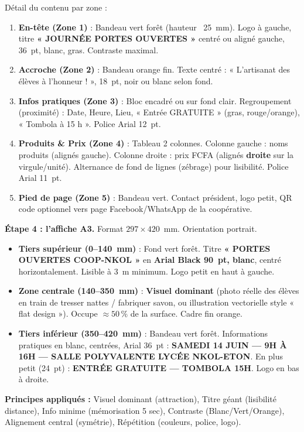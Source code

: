 \documentclass[11pt]{article}
\begin{document}
\begin{exoresolu}
Détail du contenu par zone :
\begin{enumerate}
  \item \textbf{En-tête (Zone 1)} : Bandeau vert forêt (hauteur ~25~mm). Logo à gauche, titre \textbf{« JOURNÉE PORTES OUVERTES »} centré ou aligné gauche, 36~pt, blanc, gras. Contraste maximal.
  \item \textbf{Accroche (Zone 2)} : Bandeau orange fin. Texte centré : « L'artisanat des élèves à l'honneur ! », 18~pt, noir ou blanc selon fond.
  \item \textbf{Infos pratiques (Zone 3)} : Bloc encadré ou sur fond clair. Regroupement (proximité) : Date, Heure, Lieu, « Entrée GRATUITE » (gras, rouge/orange), « Tombola à 15 h ». Police Arial 12~pt.
  \item \textbf{Produits \& Prix (Zone 4)} : Tableau 2 colonnes. Colonne gauche : noms produits (alignés gauche). Colonne droite : prix FCFA (alignés \textbf{droite} sur la virgule/unité). Alternance de fond de lignes (zébrage) pour lisibilité. Police Arial 11~pt.
  \item \textbf{Pied de page (Zone 5)} : Bandeau vert. Contact président, logo petit, QR code optionnel vers page Facebook/WhatsApp de la coopérative.
\end{enumerate}

\textbf{Étape 4 : l'affiche A3.}
Format $297 \times 420$~mm. Orientation portrait.
\begin{itemize}
  \item \textbf{Tiers supérieur (0--140~mm)} : Fond vert forêt. Titre \textbf{« PORTES OUVERTES COOP-NKOL »} en \textbf{Arial Black 90~pt, blanc}, centré horizontalement. Lisible à 3~m minimum. Logo petit en haut à gauche.
  \item \textbf{Zone centrale (140--350~mm)} : \textbf{Visuel dominant} (photo réelle des élèves en train de tresser nattes / fabriquer savon, ou illustration vectorielle style « flat design »). Occupe $\approx 50\,\%$ de la surface. Cadre fin orange.
  \item \textbf{Tiers inférieur (350--420~mm)} : Bandeau vert forêt. Informations pratiques en blanc, centrées, Arial 36~pt : \textbf{SAMEDI 14 JUIN — 9H À 16H — SALLE POLYVALENTE LYCÉE NKOL-ETON}. En plus petit (24~pt) : \textbf{ENTRÉE GRATUITE — TOMBOLA 15H}. Logo en bas à droite.
\end{itemize}
\textbf{Principes appliqués :} Visuel dominant (attraction), Titre géant (lisibilité distance), Info minime (mémorisation 5 sec), Contraste (Blanc/Vert/Orange), Alignement central (symétrie), Répétition (couleurs, police, logo).


\end{exoresolu}
\end{document}
